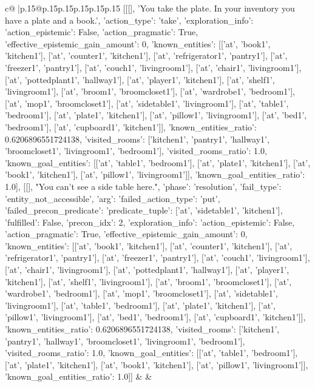\documentclass{article}
\begin{document}
{\begin{supertabular}{c@{$\;$}|p{.15\linewidth}@{}p{.15\linewidth}p{.15\linewidth}p{.15\linewidth}p{.15\linewidth}p{.15\linewidth}}
{{{	 [[[], 'You take the plate. In your inventory you have a plate and a book.', {'action_type': 'take', 'exploration_info': {'action_epistemic': False, 'action_pragmatic': True, 'effective_epistemic_gain_amount': 0, 'known_entities': [['at', 'book1', 'kitchen1'], ['at', 'counter1', 'kitchen1'], ['at', 'refrigerator1', 'pantry1'], ['at', 'freezer1', 'pantry1'], ['at', 'couch1', 'livingroom1'], ['at', 'chair1', 'livingroom1'], ['at', 'pottedplant1', 'hallway1'], ['at', 'player1', 'kitchen1'], ['at', 'shelf1', 'livingroom1'], ['at', 'broom1', 'broomcloset1'], ['at', 'wardrobe1', 'bedroom1'], ['at', 'mop1', 'broomcloset1'], ['at', 'sidetable1', 'livingroom1'], ['at', 'table1', 'bedroom1'], ['at', 'plate1', 'kitchen1'], ['at', 'pillow1', 'livingroom1'], ['at', 'bed1', 'bedroom1'], ['at', 'cupboard1', 'kitchen1']], 'known_entities_ratio': 0.6206896551724138, 'visited_rooms': ['kitchen1', 'pantry1', 'hallway1', 'broomcloset1', 'livingroom1', 'bedroom1'], 'visited_rooms_ratio': 1.0, 'known_goal_entities': [['at', 'table1', 'bedroom1'], ['at', 'plate1', 'kitchen1'], ['at', 'book1', 'kitchen1'], ['at', 'pillow1', 'livingroom1']], 'known_goal_entities_ratio': 1.0}}], [[], "You can't see a side table here.", {'phase': 'resolution', 'fail_type': 'entity_not_accessible', 'arg': {'failed_action_type': 'put', 'failed_precon_predicate': {'predicate_tuple': ['at', 'sidetable1', 'kitchen1'], 'fulfilled': False, 'precon_idx': 2}}, 'exploration_info': {'action_epistemic': False, 'action_pragmatic': True, 'effective_epistemic_gain_amount': 0, 'known_entities': [['at', 'book1', 'kitchen1'], ['at', 'counter1', 'kitchen1'], ['at', 'refrigerator1', 'pantry1'], ['at', 'freezer1', 'pantry1'], ['at', 'couch1', 'livingroom1'], ['at', 'chair1', 'livingroom1'], ['at', 'pottedplant1', 'hallway1'], ['at', 'player1', 'kitchen1'], ['at', 'shelf1', 'livingroom1'], ['at', 'broom1', 'broomcloset1'], ['at', 'wardrobe1', 'bedroom1'], ['at', 'mop1', 'broomcloset1'], ['at', 'sidetable1', 'livingroom1'], ['at', 'table1', 'bedroom1'], ['at', 'plate1', 'kitchen1'], ['at', 'pillow1', 'livingroom1'], ['at', 'bed1', 'bedroom1'], ['at', 'cupboard1', 'kitchen1']], 'known_entities_ratio': 0.6206896551724138, 'visited_rooms': ['kitchen1', 'pantry1', 'hallway1', 'broomcloset1', 'livingroom1', 'bedroom1'], 'visited_rooms_ratio': 1.0, 'known_goal_entities': [['at', 'table1', 'bedroom1'], ['at', 'plate1', 'kitchen1'], ['at', 'book1', 'kitchen1'], ['at', 'pillow1', 'livingroom1']], 'known_goal_entities_ratio': 1.0}}]] 
	  } 
	   } 
	   } 
	 & & \\ 
 


\end{supertabular}}
\end{document}
